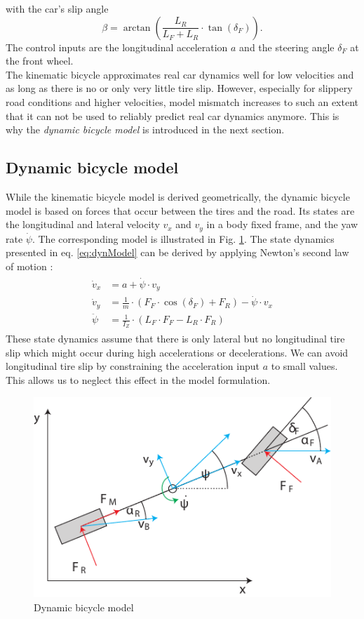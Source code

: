 with the car's slip angle
\begin{equation}
    \beta = \arctan\left(\frac{L_R}{L_F+L_R}\cdot \tan(\delta_F)\right).
\end{equation}
The control inputs are the longitudinal acceleration $a$ and the steering angle $\delta_F$ at the front wheel.\\
The kinematic bicycle approximates real car dynamics well for low velocities and as long as there is no or only very little tire slip. However, especially for slippery road conditions and higher velocities, model mismatch increases to such an extent that it can not be used to reliably predict real car dynamics anymore. This is why the \emph{dynamic bicycle model} is introduced in the next section.

\subsection{Dynamic bicycle model}
While the kinematic bicycle model is derived geometrically, the dynamic bicycle model is based on forces that occur between the tires and the road. Its states are the longitudinal and lateral velocity $v_x$ and $v_y$ in a body fixed frame, and the yaw rate $\dot \psi$. The corresponding model is illustrated in Fig. \ref{fig:dynModel}. The state dynamics presented in eq. \eqref{eq:dynModel} can be derived by applying Newton's second law of motion \cite{Kong2015}:
\begin{align}
\begin{split}
\label{eq:dynModel}
    \dot v_x &= a+\dot \psi\cdot v_y\\
    \dot v_y &= \frac{1}{m}\cdot (F_F\cdot \cos(\delta_F)+F_R)-\dot\psi\cdot v_x\\
    \ddot \psi &= \frac{1}{I_Z}\cdot(L_F\cdot F_F - L_R\cdot F_R)
\end{split}
\end{align}
These state dynamics assume that there is only lateral but no longitudinal tire slip which might occur during high accelerations or decelerations. We can avoid longitudinal tire slip by constraining the acceleration input $a$ to small values. This allows us to neglect this effect in the model formulation.
\begin{figure}[ht]
	\centering
  	\includegraphics{../../Figures/Models/DynModel.pdf}
	\caption{Dynamic bicycle model}
	\label{fig:dynModel}
\end{figure}

